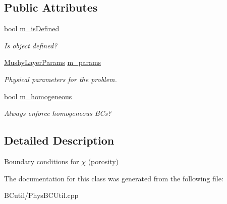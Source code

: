\subsection*{Public Attributes}
\begin{DoxyCompactItemize}
\item 
\hypertarget{class_basic_porosity_b_c_function_a09707c923fe27821207921a39b4d6710}{bool \hyperlink{class_basic_porosity_b_c_function_a09707c923fe27821207921a39b4d6710}{m\-\_\-is\-Defined}}\label{class_basic_porosity_b_c_function_a09707c923fe27821207921a39b4d6710}

\begin{DoxyCompactList}\small\item\em Is object defined? \end{DoxyCompactList}\item 
\hypertarget{class_basic_porosity_b_c_function_aaf8037fb768a7cddb58a969843c63095}{\hyperlink{class_mushy_layer_params}{Mushy\-Layer\-Params} \hyperlink{class_basic_porosity_b_c_function_aaf8037fb768a7cddb58a969843c63095}{m\-\_\-params}}\label{class_basic_porosity_b_c_function_aaf8037fb768a7cddb58a969843c63095}

\begin{DoxyCompactList}\small\item\em Physical parameters for the problem. \end{DoxyCompactList}\item 
\hypertarget{class_basic_porosity_b_c_function_a46e10e855ec5f21055f892d921756c60}{bool \hyperlink{class_basic_porosity_b_c_function_a46e10e855ec5f21055f892d921756c60}{m\-\_\-homogeneous}}\label{class_basic_porosity_b_c_function_a46e10e855ec5f21055f892d921756c60}

\begin{DoxyCompactList}\small\item\em Always enforce homogeneous B\-Cs? \end{DoxyCompactList}\end{DoxyCompactItemize}


\subsection{Detailed Description}
Boundary conditions for $\chi$ (porosity) 

The documentation for this class was generated from the following file\-:\begin{DoxyCompactItemize}
\item 
B\-Cutil/Phys\-B\-C\-Util.\-cpp\end{DoxyCompactItemize}
